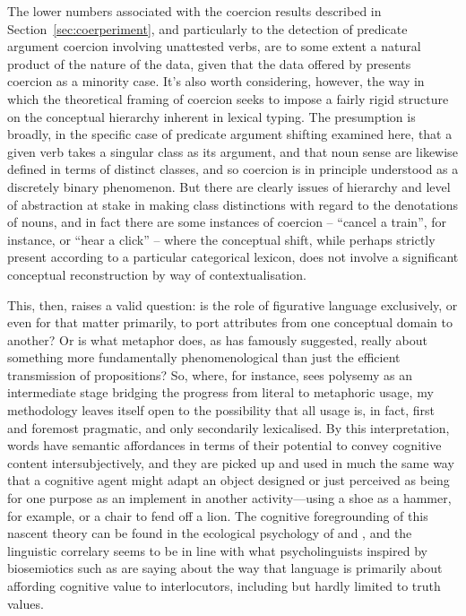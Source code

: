 The lower numbers associated with the coercion results described in Section~\ref{sec:coerperiment}, and particularly to the detection of predicate argument coercion involving unattested verbs, are to some extent a natural product of the nature of the data, given that the data offered by \cite{PustejovskyEA2010} presents coercion as a minority case.  It's also worth considering, however, the way in which the theoretical framing of coercion seeks to impose a fairly rigid structure on the conceptual hierarchy inherent in lexical typing.  The presumption is broadly, in the specific case of predicate argument shifting examined here, that a given verb takes a singular class as its argument, and that noun sense are likewise defined in terms of distinct classes, and so coercion is in principle understood as a discretely binary phenomenon.  But there are clearly issues of hierarchy and level of abstraction at stake in making class distinctions with regard to the denotations of nouns, and in fact there are some instances of coercion -- ``cancel a train'', for instance, or ``hear a click'' -- where the conceptual shift, while perhaps strictly present according to a particular categorical lexicon, does not involve a significant conceptual reconstruction by way of contextualisation.

This, then, raises a valid question: is the role of figurative language exclusively, or even for that matter primarily, to port attributes from one conceptual domain to another?  Or is what metaphor does, as \cite{Davidson1978} has famously suggested, really about something more fundamentally phenomenological than just the efficient transmission of propositions?  So, where, for instance, \cite{Sweetser1990} sees polysemy as an intermediate stage bridging the progress from literal to metaphoric usage, my methodology leaves itself open to the possibility that all usage is, in fact, first and foremost pragmatic, and only secondarily lexicalised.  By this interpretation, words have semantic affordances in terms of their potential to convey cognitive content intersubjectively, and they are picked up and used in much the same way that a cognitive agent might adapt an object designed or just perceived as being for one purpose as an implement in another activity---using a shoe as a hammer, for example, or a chair to fend off a lion.  The cognitive foregrounding of this nascent theory can be found in the ecological psychology of \cite{Bateson1972} and \cite{Gibson1979}, and the linguistic correlary seems to be in line with what psycholinguists inspired by biosemiotics such as \cite{RaczasekLeonardiEA2015} are saying about the way that language is primarily about affording cognitive value to interlocutors, including but hardly limited to truth values.

